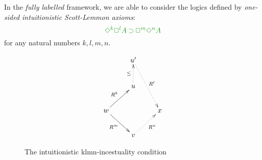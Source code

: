 %
%
%
%



In the \emph{fully labelled} framework, we are able to consider the logics defined by \emph{one-sided intuitionistic Scott-Lemmon axioms}:
\begin{equation}
\fm{\DIA^{k} \BOX^{l} A \IMP \BOX^{m}\DIA^{n} A}
\end{equation}
for any natural numbers $k,l,m,n$.

\begin{figure}
	$$
	\xymatrix{
		& u' \ar@{.>}[ddr]^{R^l} \\
		& u \ar@{.>}[u]^{\le} \\
		w \ar@{->}[ur]^{R^k}\ar@{->}[dr]_{R^m} && x \\
		& v \ar@{.>}[ur]_{R^n}
	}
	$$
	\caption{The intuitionistic klmn-incestuality condition}
	\label{fig:gklmn}
\end{figure}

